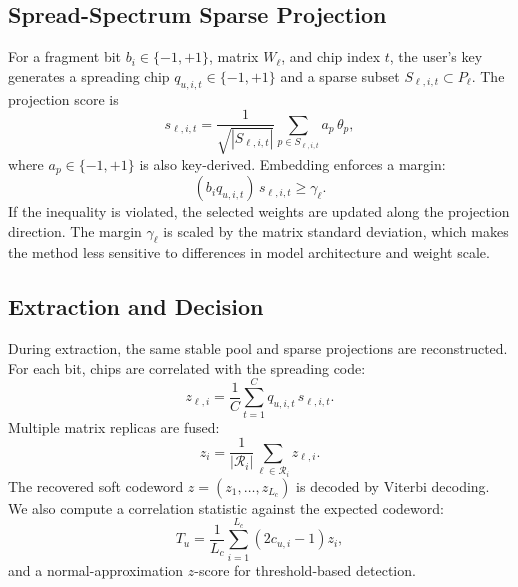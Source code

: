 \documentclass[sigconf]{acmart}
\begin{document}
\subsection{Spread-Spectrum Sparse Projection}
For a fragment bit $b_i \in \{-1,+1\}$, matrix $W_\ell$, and chip index $t$, the user's key generates a spreading chip $q_{u,i,t}\in\{-1,+1\}$ and a sparse subset $S_{\ell,i,t}\subset P_\ell$. The projection score is
\begin{equation}
s_{\ell,i,t} = \frac{1}{\sqrt{|S_{\ell,i,t}|}}
\sum_{p\in S_{\ell,i,t}} a_{p}\,\theta_p,
\end{equation}
where $a_p\in\{-1,+1\}$ is also key-derived. Embedding enforces a margin:
\begin{equation}
(b_i q_{u,i,t})\,s_{\ell,i,t} \ge \gamma_\ell.
\end{equation}
If the inequality is violated, the selected weights are updated along the projection direction. The margin $\gamma_\ell$ is scaled by the matrix standard deviation, which makes the method less sensitive to differences in model architecture and weight scale.

\subsection{Extraction and Decision}
During extraction, the same stable pool and sparse projections are reconstructed. For each bit, chips are correlated with the spreading code:
\begin{equation}
z_{\ell,i}=\frac{1}{C}\sum_{t=1}^{C}q_{u,i,t}\,s_{\ell,i,t}.
\end{equation}
Multiple matrix replicas are fused:
\begin{equation}
z_i = \frac{1}{|\mathcal{R}_i|}\sum_{\ell\in\mathcal{R}_i}z_{\ell,i}.
\end{equation}
The recovered soft codeword $z=(z_1,\ldots,z_{L_c})$ is decoded by Viterbi decoding. We also compute a correlation statistic against the expected codeword:
\begin{equation}
T_u=\frac{1}{L_c}\sum_{i=1}^{L_c}(2c_{u,i}-1)z_i,
\end{equation}
and a normal-approximation $z$-score for threshold-based detection.
\end{document}
